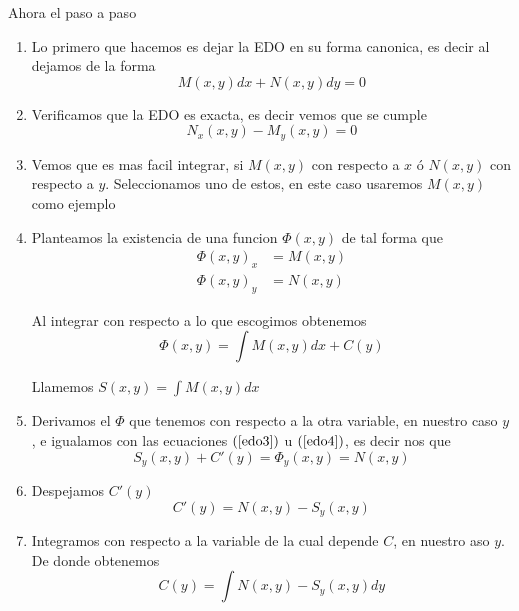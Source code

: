 \documentclass[a4paper,oneside,10.5pt]{article}
\begin{document}
Ahora el paso a paso
\begin{enumerate}
  \item Lo primero que hacemos es dejar la EDO en su forma canonica, es decir al dejamos de la forma
        \begin{equation*}
          M(x, y) dx + N(x, y) dy = 0
        \end{equation*}
  \item Verificamos que la EDO es exacta, es decir vemos que se cumple
        \begin{equation*}
          N_{x}(x, y) - M_{y}(x, y) = 0
        \end{equation*}
  \item Vemos que es mas facil integrar, si $M(x, y)$ con respecto a $x$ \'o $N(x, y)$ con respecto a $y$.
        Seleccionamos uno de estos, en este caso usaremos $M(x, y)$ como ejemplo

  \item Planteamos la existencia de una funcion $\Phi(x, y)$ de tal forma que
        \begin{align}
          \Phi(x, y)_{x} &= M(x, y) \label{edo3}\\
          \Phi(x, y)_{y} &= N(x, y) \label{edo4}
        \end{align}

        Al integrar con respecto a lo que escogimos obtenemos
        \begin{equation}
          \Phi(x, y) = \int M(x, y) dx + C(y) \label{wea}
        \end{equation}

        Llamemos $S(x, y) = \int M(x, y) dx$
  \item Derivamos el $\Phi$ que tenemos con respecto a la otra variable, en nuestro caso $y$, e igualamos con las ecuaciones $(\ref{edo3})$ u $(\ref{edo4})$, es decir nos que
        \begin{equation*}
          S_{y}(x, y) + C'(y) = \Phi_{y}(x, y) = N(x, y)
        \end{equation*}

  \item Despejamos $C'(y)$
        \begin{equation*}
          C'(y) = N(x, y) - S_{y}(x, y)
        \end{equation*}

  \item Integramos con respecto a la variable de la cual depende $C$, en nuestro aso $y$. De donde obtenemos
        \begin{equation*}
          C(y) = \int N(x, y) - S_{y}(x, y) dy
        \end{equation*}


\end{enumerate}
\end{document}

